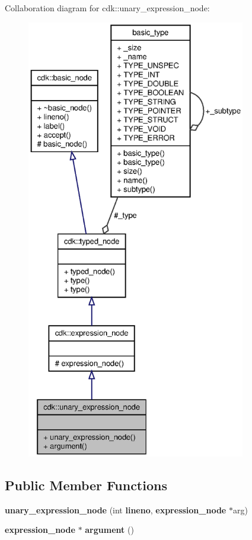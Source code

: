 Collaboration diagram for cdk\+:\+:unary\+\_\+expression\+\_\+node\+:
\nopagebreak
\begin{figure}[H]
\begin{center}
\leavevmode
\includegraphics[height=550pt]{classcdk_1_1unary__expression__node__coll__graph}
\end{center}
\end{figure}
\subsection*{Public Member Functions}
\begin{DoxyCompactItemize}
\item 
\mbox{\label{classcdk_1_1unary__expression__node_ae8b80218d68be7ff2c876ad24dc63a3d}} 
{\bfseries unary\+\_\+expression\+\_\+node} (int \textbf{ lineno}, \textbf{ expression\+\_\+node} $\ast$arg)
\item 
\mbox{\label{classcdk_1_1unary__expression__node_ac0d970616c9475447bb6ab11669e18bf}} 
\textbf{ expression\+\_\+node} $\ast$ {\bfseries argument} ()
\end{DoxyCompactItemize}
